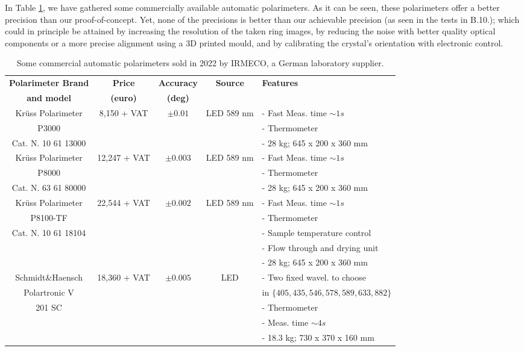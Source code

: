 \documentclass[11pt, a4paper, twoside]{article} %
\begin{document}
In Table \ref{tab:commercial}, we have gathered some commercially available automatic polarimeters. As it can be seen, these polarimeters offer a better precision than our proof-of-concept. Yet, none of the precisions is better than our achievable precision (as seen in the tests in B.10.); which could in principle be attained by increasing the resolution of the taken ring images, by reducing the noise with better quality optical components or a more precise alignment using a 3D printed mould, and by calibrating the crystal's orientation with electronic control.\vspace{0.1cm}
\begin{table}[h!]
\caption{Some commercial automatic polarimeters sold in 2022 by IRMECO, a German laboratory supplier.\vspace{-0.3cm} }
{\small 
\center
\label{tab:commercial}
\begin{tabular}{c|c|c|c|l}
\toprule
{\bf Polarimeter Brand} & {\bf Price } & {\bf Accuracy} & {\bf Source} &{\bf 	Features}\\
{\bf and model} & {\bf (euro)} & {\bf (deg)} & \\

\midrule
Krüss Polarimeter & 8,150 {\footnotesize + VAT} & $\pm 0.01$ & LED 589 nm & - Fast Meas. time $\sim 1s$\\
P3000  & & & & - Thermometer\\ Cat. N. 10 61 13000 & & & & - 28 kg; 645 x 200 x 360 mm\\ \hline\rule{0pt}{4mm}{}
Krüss Polarimeter & 12,247 {\footnotesize + VAT} & $\pm 0.003$ & LED 589 nm & - Fast Meas. time $\sim 1s$\\
P8000 & & & & - Thermometer \\ Cat. N. 63 61 80000 & & & & - 28 kg; 645 x 200 x 360 mm\\ \hline\rule{0pt}{4mm}{}
Krüss Polarimeter & 22,544 {\footnotesize + VAT} & $\pm 0.002$ & LED 589 nm & - Fast Meas. time $\sim 1s$\\
P8100-TF  & & & & - Thermometer \\
Cat. N. 10 61 18104 & & & & - Sample temperature control\\
& & & & - Flow through and drying unit \\ & & & & - 28 kg; 645 x 200 x 360 mm\\ \hline\rule{0pt}{4mm}{}
 Schmidt\&Haensch & 18,360 {\footnotesize + VAT} & $\pm 0.005$ & LED & - Two fixed wavel. to choose\\
  Polartronic V& & & & in {\small $\{405, 435, 546, 578, 589, 633, 882\}$}\\
  201 SC & & & & - Thermometer\\
    & & & & - Meas. time $\sim 4s$ \\
    & & & & - 18.3 kg; 730 x 370 x 160 mm \\

 \bottomrule
\end{tabular}
}\vspace{-0.3cm}
\end{table}
\end{document}
